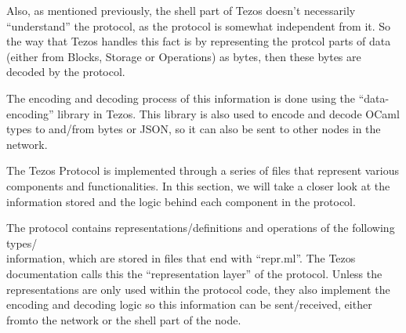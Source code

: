 Also, as mentioned previously, the shell part of Tezos doesn't necessarily ``understand'' the protocol, as the protocol is somewhat independent from it. So the way that Tezos handles this fact is by representing the protcol parts of data (either from Blocks, Storage or Operations) as bytes, then these bytes are decoded by the protocol.

The encoding and decoding process of this information is done using the ``data-encoding'' library in Tezos. This library is also used to encode and decode OCaml types to and/from bytes or JSON, so it can also be sent to other nodes in the network.

The Tezos Protocol is implemented through a series of files that represent various components and functionalities. In this section, we will take a closer look at the information stored and the logic behind each component in the protocol.

The protocol contains representations/definitions and operations of the following types/\\information, which are stored in files that end with ``repr.ml''. 
The Tezos documentation calls this the ``representation layer'' of the protocol. Unless the representations are only used within the protocol code, they also implement the encoding and decoding logic so this information can be sent/received, either from\/to the network or the shell part of the node.

